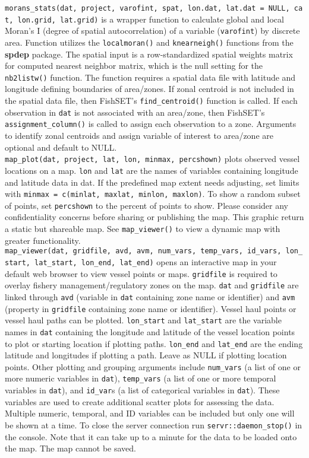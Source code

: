 \documentclass[
]{article}
\begin{document}
\texttt{morans\_stats(dat,\ project,\ varofint,\ spat,\ lon.dat,\ lat.dat\ =\ NULL,\ cat,\ lon.grid,\ lat.grid)} is a wrapper function to calculate global and local Moran's I (degree of spatial autocorrelation) of a variable (\texttt{varofint}) by discrete area. Function utilizes the \texttt{localmoran()} and \texttt{knearneigh()} functions from the \textbf{spdep} package. The spatial input is a row-standardized spatial weights matrix for computed nearest neighbor matrix, which is the null setting for the \texttt{nb2listw()} function. The function requires a spatial data file with latitude and longitude defining boundaries of area/zones. If zonal centroid is not included in the spatial data file, then FishSET's \texttt{find\_centroid()} function is called. If each observation in \texttt{dat} is not associated with an area/zone, then FishSET's \texttt{assignment\_column()} is called to assign each observation to a zone. Arguments to identify zonal centroids and assign variable of interest to area/zone are optional and default to NULL.\\
\texttt{map\_plot(dat,\ project,\ lat,\ lon,\ minmax,\ percshown)} plots observed vessel locations on a map. \texttt{lon} and \texttt{lat} are the names of variables containing longitude and latitude data in dat. If the predefined map extent needs adjusting, set limits with \texttt{minmax\ =\ c(minlat,\ maxlat,\ minlon,\ maxlon)}. To show a random subset of points, set \texttt{percshown} to the percent of points to show. Please consider any confidentiality concerns before sharing or publishing the map. This graphic return a static but shareable map. See \texttt{map\_viewer()} to view a dynamic map with greater functionality.\\
\texttt{map\_viewer(dat,\ gridfile,\ avd,\ avm,\ num\_vars,\ temp\_vars,\ id\_vars,\ lon\_start,\ lat\_start,\ lon\_end,\ lat\_end)} opens an interactive map in your default web browser to view vessel points or maps. \texttt{gridfile} is required to overlay fishery management/regulatory zones on the map. \texttt{dat} and \texttt{gridfile} are linked through \texttt{avd} (variable in \texttt{dat} containing zone name or identifier) and \texttt{avm} (property in \texttt{gridfile} containing zone name or identifier). Vessel haul points or vessel haul paths can be plotted. \texttt{lon\_start} and \texttt{lat\_start} are the variable names in \texttt{dat} containing the longitude and latitude of the vessel location points to plot or starting location if plotting paths. \texttt{lon\_end} and \texttt{lat\_end} are the ending latitude and longitudes if plotting a path. Leave as NULL if plotting location points. Other plotting and grouping arguments include \texttt{num\_vars} (a list of one or more numeric variables in \texttt{dat}), \texttt{temp\_vars} (a list of one or more temporal variables in \texttt{dat}), and \texttt{id\_var}s (a list of categorical variables in \texttt{dat}). These variables are used to create additional scatter plots for assessing the data. Multiple numeric, temporal, and ID variables can be included but only one will be shown at a time. To close the server connection run \texttt{servr::daemon\_stop()} in the console. Note that it can take up to a minute for the data to be loaded onto the map. The map cannot be saved.\\
\end{document}
